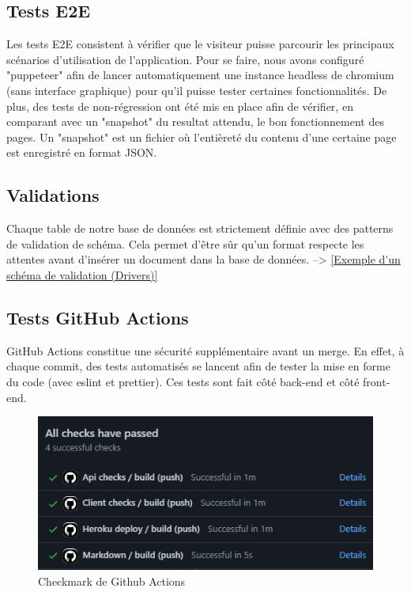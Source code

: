 \subsection{Tests E2E}
Les tests E2E consistent à vérifier que le visiteur puisse parcourir les principaux scénarios d’utilisation de l’application. Pour se faire, nous avons configuré "puppeteer" afin de lancer automatiquement une instance headless de chromium (sans interface graphique) pour qu'il puisse tester certaines fonctionnalités. De plus, des tests de non-régression ont été mis en place afin de vérifier, en comparant avec un "snapshot" du resultat attendu, le bon fonctionnement des pages. Un "snapshot" est un fichier où l'entièreté du contenu d'une certaine page est enregistré en format JSON.

\subsection{Validations}

Chaque table de notre base de données est strictement définie avec des patterns de validation de schéma. Cela permet d'être sûr qu'un format respecte les attentes avant d'insérer un document dans la base de données. --> \ref{Exemple d'un schéma de validation (Drivers)}

\subsection{Tests GitHub Actions}

GitHub Actions constitue une sécurité supplémentaire avant un merge. En effet, à chaque commit, des tests automatisés se lancent afin de tester la mise en forme du code (avec eslint et prettier). Ces tests sont fait côté back-end et côté front-end.

\begin{figure}[th]
\centering
\includegraphics{medias/githubChecks.png}
\decoRule
\caption{Checkmark de Github Actions}
\end{figure}

